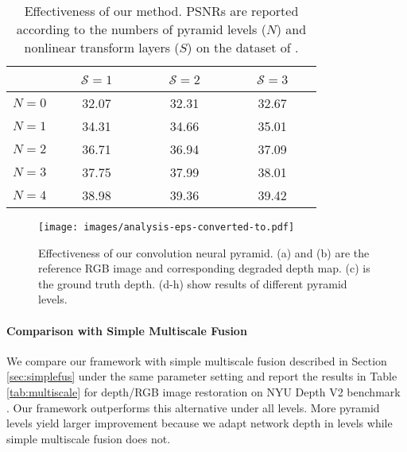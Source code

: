 \documentclass[10pt,twocolumn,letterpaper]{article}
\begin{document}
\begin{table}[t]
\centering \small
\begin{tabular}{|c|c|c|c|}
  \hline
  & ~~~$\mathcal{S}=1$~~~ & ~~~$\mathcal{S}=2$~~~ & ~~~$\mathcal{S}=3$~~~ \\
  \hline
  \hline
  $N=0$ & 32.07 & 32.31 & 32.67\\
  \hline
  $N=1$ & 34.31 & 34.66 & 35.01\\
  \hline
  $N=2$ & 36.71 & 36.94 & 37.09\\
  \hline
  $N=3$ & 37.75 & 37.99 & 38.01\\
  \hline
  $N=4$ & 38.98 & 39.36 & 39.42\\
  \hline
\end{tabular}\vspace{0.1in}
\caption{Effectiveness of our method. PSNRs are reported according to the numbers of
pyramid levels ($N$) and nonlinear transform layers ($S$) on the dataset of
\cite{SilbermanHKF12}.}\label{tab:parachange}
\end{table}

\begin{figure*}[t]
\centering
\texttt{[image: images/analysis-eps-converted-to.pdf]}
\caption{Effectiveness of our convolution neural pyramid. (a) and (b) are the reference
RGB image and corresponding degraded depth map. (c) is the ground truth depth. (d-h) show
results of different pyramid levels.\vspace{-0.1in}} \label{fig:effectiveness}
\end{figure*}


\vspace{-0.1in}\paragraph{Comparison with Simple Multiscale Fusion} We compare our
framework with simple multiscale fusion described in Section \ref{sec:simplefus} under
the same parameter setting and report the results in Table \ref{tab:multiscale} for
depth/RGB image restoration on NYU Depth V2 benchmark \cite{SilbermanHKF12}. Our
framework outperforms this alternative under all levels. More pyramid levels yield larger
improvement because we adapt network depth in levels while simple multiscale fusion does
not.
\end{document}
